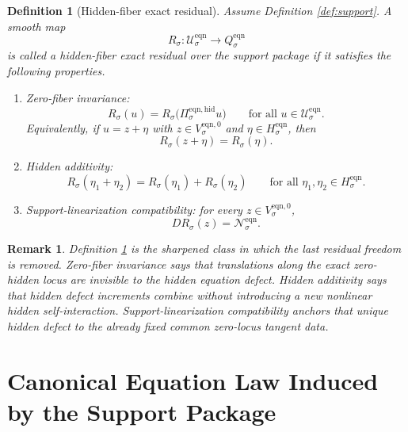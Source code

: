\documentclass[11pt]{article}
\newcommand{\EqnSpace}[1]{\mathcal U_{#1}^{\mathrm{eqn}}}
\newcommand{\EqnTarget}[1]{Q_{#1}^{\mathrm{eqn}}}
\newcommand{\EqnZero}[1]{V_{#1}^{\mathrm{eqn},0}}
\newcommand{\EqnHidden}[1]{H_{#1}^{\mathrm{eqn}}}
\newcommand{\EqnProj}[1]{\Pi_{#1}^{\mathrm{eqn,hid}}}
\newcommand{\EqnLin}[1]{\mathcal N_{#1}^{\mathrm{eqn}}}
\newtheorem{definition}{Definition}
\newtheorem{remark}{Remark}
\begin{document}
\begin{definition}[Hidden-fiber exact residual]
\label{def:exact}
Assume Definition \ref{def:support}. A smooth map
\[
R_{\sigma}:\EqnSpace{\sigma}\to\EqnTarget{\sigma}
\]
is called a \emph{hidden-fiber exact residual} over the support package if it satisfies the following properties.
\begin{enumerate}
    \item Zero-fiber invariance:
    \begin{equation}
    R_{\sigma}(u)
    =
    R_{\sigma}\bigl(\EqnProj{\sigma}u\bigr)
    \qquad
    \text{for all }u\in\EqnSpace{\sigma}.
    \label{eq:exactinvariant}
    \end{equation}
    Equivalently, if \(u=z+\eta\) with \(z\in\EqnZero{\sigma}\) and \(\eta\in\EqnHidden{\sigma}\), then
    \[
    R_{\sigma}(z+\eta)=R_{\sigma}(\eta).
    \]
    \item Hidden additivity:
    \begin{equation}
    R_{\sigma}(\eta_{1}+\eta_{2})
    =
    R_{\sigma}(\eta_{1})
    +
    R_{\sigma}(\eta_{2})
    \qquad
    \text{for all }\eta_{1},\eta_{2}\in\EqnHidden{\sigma}.
    \label{eq:exactadditive}
    \end{equation}
    \item Support-linearization compatibility: for every \(z\in\EqnZero{\sigma}\),
    \begin{equation}
    DR_{\sigma}(z)=\EqnLin{\sigma}.
    \label{eq:exactlinearization}
    \end{equation}
\end{enumerate}
\end{definition}

\begin{remark}
Definition \ref{def:exact} is the sharpened class in which the last residual freedom is removed. Zero-fiber invariance says that translations along the exact zero-hidden locus are invisible to the hidden equation defect. Hidden additivity says that hidden defect increments combine without introducing a new nonlinear hidden self-interaction. Support-linearization compatibility anchors that unique hidden defect to the already fixed common zero-locus tangent data.
\end{remark}

\section{Canonical Equation Law Induced by the Support Package}
\end{document}
